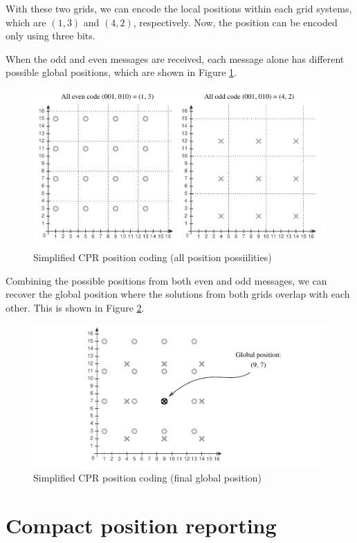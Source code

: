 With these two grids, we can encode the local positions within each grid systems, which are $(1,3)$ and $(4,2)$, respectively. Now, the position can be encoded only using three bits. 

When the odd and even messages are received, each message alone has different possible global positions, which are shown in Figure \ref{fig:cpr_simple_2}.

\begin{figure}[!ht]
  \includegraphics[width=0.9\linewidth]{figures/adsb/cpr_simple_2.pdf}
  \caption{Simplified CPR position coding (all position possiilities)}
  \label{fig:cpr_simple_2}
\end{figure}

Combining the possible positions from both even and odd messages, we can recover the global position where the solutions from both grids overlap with each other. This is shown in Figure \ref{fig:cpr_simple_3}.

\begin{figure}[!ht]
  \includegraphics[width=0.9\linewidth]{figures/adsb/cpr_simple_3.pdf}
  \caption{Simplified CPR position coding (final global position)}
  \label{fig:cpr_simple_3}
\end{figure}

\newpage

\section{Compact position reporting}

